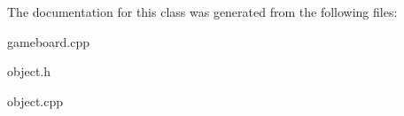 The documentation for this class was generated from the following files\+:\begin{DoxyCompactItemize}
\item 
gameboard.\+cpp\item 
object.\+h\item 
object.\+cpp\end{DoxyCompactItemize}
